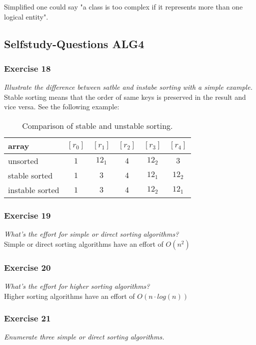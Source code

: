 Simplified one could say "a class is too complex if it represents more than
one logical entity".

\subsection{Selfstudy-Questions ALG4}

\subsubsection*{Exercise 18}
\textit{Illustrate the difference between satble and instabe sorting with a 
simple example.} \\
Stable sorting means that the order of same keys is preserved in the
result and vice versa. See the following example:

\begin{table}[h!]
	\centering
	\begin{tabular}{l c c c c c}
		array	& $[r_0]$ & $[r_1]$ & $[r_2]$ & $[r_3]$ & $[r_4]$ \\ 
		\hline
		unsorted 	& $1$ & $12_1$ & $4$ & $12_2$ & $3$ \\
		stable sorted 	& $1$ & $3$ & $4$ & $12_1$ & $12_2$ \\
		instable sorted	& $1$ & $3$ & $4$ & $12_2$ & $12_1$
	\end{tabular}
	\caption{Comparison of stable and unstable sorting.}
\end{table}

\subsubsection*{Exercise 19}
\textit{What's the effort for simple or direct sorting algorithms?} \\
Simple or direct sorting algorithms have an effort of $O(n^2)$

\subsubsection*{Exercise 20}
\textit{What's the effort for higher sorting algorithms?} \\
Higher sorting algorithms have an effort of $O(n \cdot log(n))$

\subsubsection*{Exercise 21}
\textit{Enumerate three simple or direct sorting algorithms.} \\

